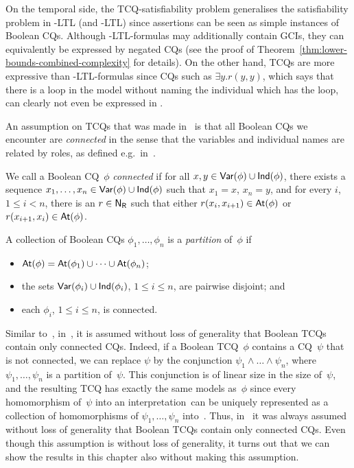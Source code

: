On the temporal side, the TCQ-satisfiability problem generalises the
satisfiability problem in \ALC-LTL (and \SHQ-LTL) since assertions can be seen
as simple instances of Boolean CQs.
%
Although \ALC-LTL-formulas may additionally contain GCIs, they can equivalently
be expressed by negated CQs (see the proof of
Theorem~\ref{thm:lower-bounds-combined-complexity} for details).
%
On the other hand, TCQs are more expressive than \SHQ-LTL-formulas since CQs
such as $\exists y.r(y,y)$, which says that there is a loop in the model without
naming the individual which has the loop, can clearly not even be expressed in
\ALC.

An assumption on TCQs that was made in~\cite{BaBL-CADE13} is that
all Boolean CQs we encounter are \emph{connected} in the sense that the
variables and individual names are related by roles, as defined e.g.\
in~\cite{Tes-PhD01,RuGl-JAIR10}.

\begin{definition}
    We call a Boolean CQ~$\phi$ \emph{connected} if for all
    $x,y\in\operatorname{\mathsf{Var}}(\phi)\cup\mathsf{Ind}(\phi)$, there exists a sequence
    $x_1,\dots,x_n\in\operatorname{\mathsf{Var}}(\phi)\cup\mathsf{Ind}(\phi)$ such that $x_1=x$, $x_n=y$, and
    for every $i$, $1\le i<n$, there is an $r\in\mathsf{N_R}$ such that either
    $r(x_i,x_{i+1})\in\operatorname{\mathsf{At}}(\phi)$ or $r(x_{i+1},x_i)\in\operatorname{\mathsf{At}}(\phi)$.

    A collection of Boolean CQs $\phi_1,\dots,\phi_n$ is a \emph{partition}
    of~$\phi$ if
    \begin{itemize}
        \item $\operatorname{\mathsf{At}}(\phi)=\operatorname{\mathsf{At}}(\phi_1)\cup\dots\cup\operatorname{\mathsf{At}}(\phi_n)$;
        \item the sets $\operatorname{\mathsf{Var}}(\phi_i)\cup\mathsf{Ind}(\phi_i)$, $1\le i\le n$, are
            pairwise disjoint; and
        \item each $\phi_i$, $1\le i\le n$, is connected.
    \end{itemize}
\end{definition}

\noindent
Similar to~\cite{Tes-PhD01,RuGl-JAIR10}, in~\cite{BaBL-CADE13}, it is assumed
without loss of generality that Boolean TCQs contain only connected CQs.
%
Indeed, if a Boolean TCQ~$\phi$ contains a CQ~$\psi$ that is not connected, we
can replace $\psi$ by the conjunction $\psi_1\land\dots\land\psi_n$, where
$\psi_1,\dots,\psi_n$ is a partition of~$\psi$.  This conjunction is of linear
size in the size of~$\psi$, and the resulting TCQ has exactly the same models
as~$\phi$ since every homomorphism of~$\psi$ into an interpretation~\Imc can be
uniquely represented as a collection of homomorphisms of $\psi_1,\dots,\psi_n$
into~\Imc.
%
Thus, in~\cite{BaBL-CADE13} it was always assumed without loss of generality
that Boolean TCQs contain only connected CQs.  Even though this assumption is
without loss of generality, it turns out that we can show the results in this
chapter also without making this assumption.

